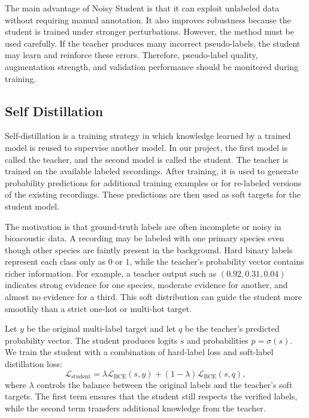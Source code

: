 \documentclass[a4paper,12pt]{article}
\begin{document}
The main advantage of Noisy Student is that it can exploit unlabeled data without requiring manual annotation. It also improves robustness because the student is trained under stronger perturbations. However, the method must be used carefully. If the teacher produces many incorrect pseudo-labels, the student may learn and reinforce these errors. Therefore, pseudo-label quality, augmentation strength, and validation performance should be monitored during training.


\subsection{Self Distillation}

Self-distillation is a training strategy in which knowledge learned by a trained model is reused to supervise another model. In our project, the first model is called the teacher, and the second model is called the student. The teacher is trained on the available labeled recordings. After training, it is used to generate probability predictions for additional training examples or for re-labeled versions of the existing recordings. These predictions are then used as soft targets for the student model.

The motivation is that ground-truth labels are often incomplete or noisy in bioacoustic data. A recording may be labeled with one primary species even though other species are faintly present in the background. Hard binary labels represent each class only as $0$ or $1$, while the teacher's probability vector contains richer information. For example, a teacher output such as $(0.92, 0.31, 0.04)$ indicates strong evidence for one species, moderate evidence for another, and almost no evidence for a third. This soft distribution can guide the student more smoothly than a strict one-hot or multi-hot target.

Let $y$ be the original multi-label target and let $q$ be the teacher's predicted probability vector. The student produces logits $s$ and probabilities $p = \sigma(s)$. We train the student with a combination of hard-label loss and soft-label distillation loss:
\[
\mathcal{L}_{\text{student}}
= \lambda \mathcal{L}_{\text{BCE}}(s, y)
+ (1 - \lambda) \mathcal{L}_{\text{BCE}}(s, q),
\]
where $\lambda$ controls the balance between the original labels and the teacher's soft targets. The first term ensures that the student still respects the verified labels, while the second term transfers additional knowledge from the teacher.
\end{document}
